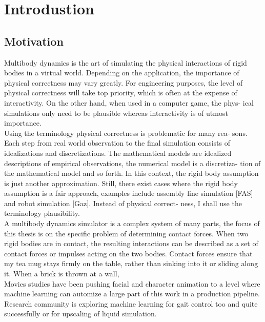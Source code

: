 \chapter{Introdustion}

\section{Motivation}
    Multibody dynamics is the art of simulating the physical interactions of rigid bodies in a virtual world. Depending on the application, the importance of physical correctness may vary greatly. For engineering purposes, the level of physical correctness will take top priority, which is often at the expense of interactivity. On the other hand, when used in a computer game, the phys- ical simulations only need to be plausible whereas interactivity is of utmost importance. \\

    Using the terminology physical correctness is problematic for many rea- sons. Each step from real world observation to the final simulation consists of idealizations and discretizations. The mathematical models are idealized descriptions of empirical observations, the numerical model is a discretiza- tion of the mathematical model and so forth. In this context, the rigid body assumption is just another approximation. Still, there exist cases where the rigid body assumption is a fair approach, examples include assembly line simulation [FAS] and robot simulation [Gaz]. Instead of physical correct- ness, I shall use the terminology plausibility.\\

    A multibody dynamics simulator is a complex system of many parts, the focus of this thesis is on the specific problem of determining contact forces. When two rigid bodies are in contact, the resulting interactions can be described as a set of contact forces or impulses acting on the two bodies. Contact forces ensure that my tea mug stays firmly on the table, rather than sinking into it or sliding along it. When a brick is thrown at a wall,\\

    Movies studies have been pushing facial and character animation to a level where machine learning can  automize a large part of this work in a production pipeline. Research community is exploring machine learning for gait control too and quite successfully or for upscaling of liquid simulation\cite{CNNFluid2016}. \\


